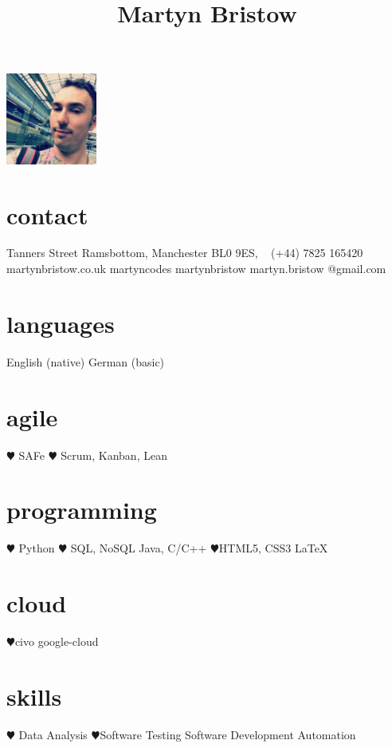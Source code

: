 \documentclass[]{cv-style}          %
\begin{document}
\lastupdated
\title{Martyn Bristow}


\begin{aside}
%
\includegraphics[width=3cm]{martyn-eurostar.jpg}
\section{contact}
 Tanners Street
\hspace*{25pt} Ramsbottom, Manchester
\hspace*{25pt} BL0 9ES,
~
\faPhone (+44) 7825 165420
~
{\faGlobe martynbristow.co.uk}
{\faTwitter martyncodes}
{\faGithub martynbristow}
{\faEnvelope martyn.bristow
@gmail.com}
\section{languages}
English (native)
German (basic)
%
\section{agile}
{\color{red} $\varheartsuit$} SAFe {\color{red} $\varheartsuit$} Scrum, Kanban, Lean
\section{programming}
{\color{red} $\varheartsuit$} Python
{\color{red} $\varheartsuit$} SQL, NoSQL
Java, C/C++
{\color{red} $\varheartsuit$}HTML5, CSS3 \LaTeX{}
\section{cloud}
{\color{red} $\varheartsuit$}civo google-cloud
\section{skills}
{\color{red} $\varheartsuit$} Data Analysis
{\color{red} $\varheartsuit$}Software Testing
Software Development
Automation

\end{aside}
\end{document}
